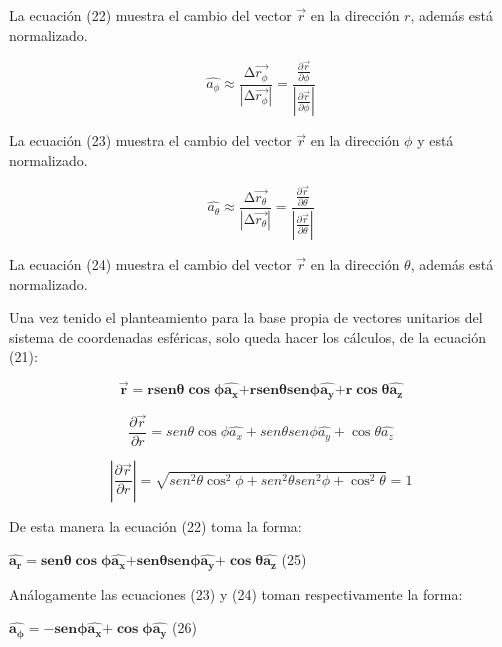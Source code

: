 \documentclass[]{article}
\begin{document}
La ecuación (22) muestra el cambio del vector \(\overrightarrow{r}\) en
la dirección \(r\), además está normalizado.

\[\widehat{a_{\phi}} \approx \frac{\mathrm{\Delta}\overrightarrow{r_{\phi}}}{\left| \mathrm{\Delta}\overrightarrow{r_{\phi}} \right|} = \frac{\frac{\partial\overrightarrow{r}}{\partial\phi}}{\left| \frac{\partial\overrightarrow{r}}{\partial\phi} \right|}\]

La ecuación (23) muestra el cambio del vector \(\overrightarrow{r}\) en
la dirección \(\phi\) y está normalizado.

\[\widehat{a_{\theta}} \approx \frac{\mathrm{\Delta}\overrightarrow{r_{\theta}}}{\left| \mathrm{\Delta}\overrightarrow{r_{\theta}} \right|} = \frac{\frac{\partial\overrightarrow{r}}{\partial\theta}}{\left| \frac{\partial\overrightarrow{r}}{\partial\theta} \right|}\]

La ecuación (24) muestra el cambio del vector \(\overrightarrow{r}\) en
la dirección \(\theta\), además está normalizado.

Una vez tenido el planteamiento para la base propia de vectores
unitarios del sistema de coordenadas esféricas, solo queda hacer los
cálculos, de la ecuación (21):

\[\overrightarrow{\mathbf{r}}\mathbf{=}\mathbf{r}\mathbf{sen}\mathbf{\theta}\mathbf{\cos}\mathbf{\phi}\widehat{\mathbf{a}_{\mathbf{x}}}\mathbf{+}\mathbf{r}\mathbf{sen}\mathbf{\theta}\mathbf{sen}\mathbf{\phi}\widehat{\mathbf{a}_{\mathbf{y}}}\mathbf{+ r}\mathbf{\cos}\mathbf{\theta}\widehat{\mathbf{a}_{\mathbf{z}}}\]

\[\frac{\partial\overrightarrow{r}}{\partial r} = {sen}\theta\cos\phi\widehat{a_{x}} + {sen}\theta{sen}\phi\widehat{a_{y}} + \cos\theta\widehat{a_{z}}\]

\[\left| \frac{\partial\overrightarrow{r}}{\partial r} \right| = \sqrt{{sen}^{2}\theta\cos^{2}\phi + {sen}^{2}\theta{sen}^{2}\phi + \cos^{2}\theta} = 1\]

De esta manera la ecuación (22) toma la forma:

\(\widehat{\mathbf{a}_{\mathbf{r}}}\mathbf{=}\mathbf{sen}\mathbf{\theta}\mathbf{\cos}\mathbf{\phi}\widehat{\mathbf{a}_{\mathbf{x}}}\mathbf{+}\mathbf{sen}\mathbf{\theta}\mathbf{sen}\mathbf{\phi}\widehat{\mathbf{a}_{\mathbf{y}}}\mathbf{+}\mathbf{\cos}\mathbf{\theta}\widehat{\mathbf{a}_{\mathbf{z}}}\)
(25)

Análogamente las ecuaciones (23) y (24) toman respectivamente la forma:

\(\widehat{\mathbf{a}_{\mathbf{\phi}}}\mathbf{= -}\mathbf{sen}\mathbf{\phi}\widehat{\mathbf{a}_{\mathbf{x}}}\mathbf{+}\mathbf{\cos}\mathbf{\phi}\widehat{\mathbf{a}_{\mathbf{y}}}\)
(26)
\end{document}
